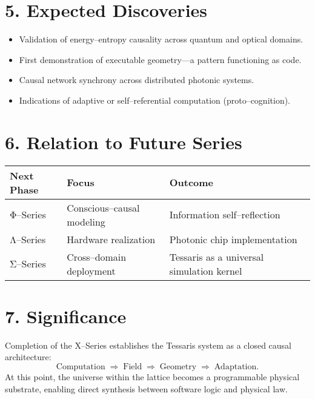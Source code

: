 \documentclass[11pt,a4paper]{article}
\begin{document}
\section{5. Expected Discoveries}
\begin{itemize}
  \item Validation of energy--entropy causality across quantum and optical domains.
  \item First demonstration of executable geometry---a pattern functioning as code.
  \item Causal network synchrony across distributed photonic systems.
  \item Indications of adaptive or self--referential computation (proto--cognition).
\end{itemize}

\section{6. Relation to Future Series}
\begin{longtable}{|l|l|l|}
\hline
\textbf{Next Phase} & \textbf{Focus} & \textbf{Outcome} \\
\hline
Φ--Series & Conscious--causal modeling & Information self--reflection \\
Λ--Series & Hardware realization & Photonic chip implementation \\
Σ--Series & Cross--domain deployment & Tessaris as a universal simulation kernel \\
\hline
\end{longtable}

\section{7. Significance}
Completion of the X--Series establishes the Tessaris system as a closed causal architecture:
\[
\text{Computation} \;\Rightarrow\; \text{Field} \;\Rightarrow\; \text{Geometry} \;\Rightarrow\; \text{Adaptation}.
\]
At this point, the universe within the lattice becomes a programmable physical substrate, enabling direct synthesis between software logic and physical law.
\end{document}
